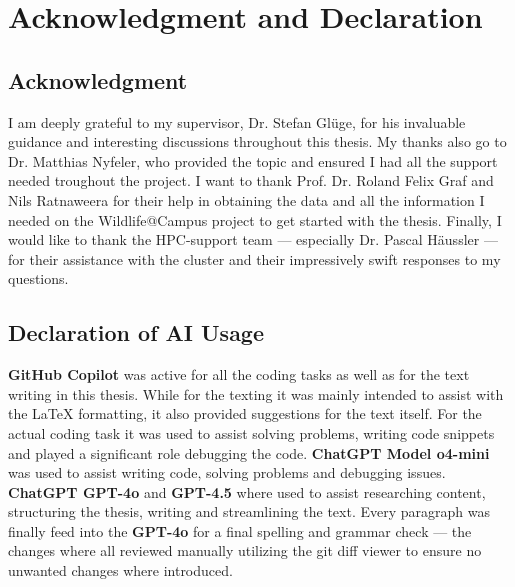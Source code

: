 


\section{Acknowledgment and Declaration}
\label{acknowledgment_declaration}

\subsection{Acknowledgment}%

I am deeply grateful to my supervisor, Dr. Stefan Glüge, for his invaluable guidance and interesting discussions throughout this thesis. 
My thanks also go to Dr. Matthias Nyfeler, who provided the topic and ensured I had all the support needed troughout the project. 
I want to thank Prof. Dr. Roland Felix Graf and Nils Ratnaweera for their help in obtaining the data and all the information I needed on the Wildlife@Campus project to get started with the thesis. 
Finally, I would like to thank the HPC-support team --- especially Dr. Pascal Häussler --- for their assistance with the cluster and their impressively swift responses to my questions.

\subsection{Declaration of AI Usage}%

\textbf{GitHub Copilot} was active for all the coding tasks as well as for the text writing in this thesis.
While for the texting it was mainly intended to assist with the LaTeX formatting, it also provided suggestions for the text itself.
For the actual coding task it was used to assist solving problems, writing code snippets and played a significant role debugging the code.
\textbf{ChatGPT Model o4-mini} was used to assist writing code, solving problems and debugging issues.
\textbf{ChatGPT GPT-4o} and \textbf{GPT-4.5} where used to assist researching content, structuring the thesis, writing and streamlining the text.
Every paragraph was finally feed into the \textbf{GPT-4o} for a final spelling and grammar check --- the changes where all reviewed manually utilizing the git diff viewer to ensure no unwanted changes where introduced.

